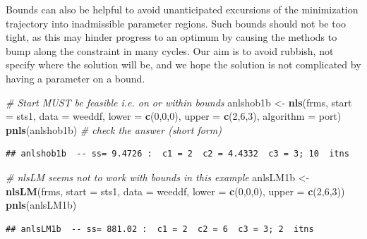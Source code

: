 \documentclass[
]{article}
\newenvironment{Shaded}{\begin{snugshade}}{\end{snugshade}}
\newcommand{\AttributeTok}[1]{\textcolor[rgb]{0.13,0.29,0.53}{#1}}
\newcommand{\CommentTok}[1]{\textcolor[rgb]{0.56,0.35,0.01}{\textit{#1}}}
\newcommand{\DecValTok}[1]{\textcolor[rgb]{0.00,0.00,0.81}{#1}}
\newcommand{\FunctionTok}[1]{\textcolor[rgb]{0.13,0.29,0.53}{\textbf{#1}}}
\newcommand{\NormalTok}[1]{#1}
\newcommand{\OtherTok}[1]{\textcolor[rgb]{0.56,0.35,0.01}{#1}}
\newcommand{\StringTok}[1]{\textcolor[rgb]{0.31,0.60,0.02}{#1}}
\begin{document}
Bounds can also be helpful to avoid unanticipated excursions of the
minimization trajectory into inadmissible parameter regions. Such bounds
should not be too tight, as this may hinder progress to an optimum by
causing the methods to bump along the constraint in many cycles. Our aim
is to avoid rubbish, not specify where the solution will be, and we hope
the solution is not complicated by having a parameter on a bound.

\begin{Shaded}
\begin{Highlighting}[]
\CommentTok{\# Start MUST be feasible i.e. on or within bounds}
\NormalTok{anlshob1b }\OtherTok{\textless{}{-}} \FunctionTok{nls}\NormalTok{(frms, }\AttributeTok{start =}\NormalTok{ sts1, }\AttributeTok{data =}\NormalTok{ weeddf, }\AttributeTok{lower =} \FunctionTok{c}\NormalTok{(}\DecValTok{0}\NormalTok{,}\DecValTok{0}\NormalTok{,}\DecValTok{0}\NormalTok{),}
             \AttributeTok{upper =} \FunctionTok{c}\NormalTok{(}\DecValTok{2}\NormalTok{,}\DecValTok{6}\NormalTok{,}\DecValTok{3}\NormalTok{), }\AttributeTok{algorithm =} \StringTok{\textquotesingle{}port\textquotesingle{}}\NormalTok{)}
\FunctionTok{pnls}\NormalTok{(anlshob1b) }\CommentTok{\#  check the answer (short form)}
\end{Highlighting}
\end{Shaded}

\begin{verbatim}
## anlshob1b  -- ss= 9.4726 :  c1 = 2  c2 = 4.4332  c3 = 3; 10  itns
\end{verbatim}

\begin{Shaded}
\begin{Highlighting}[]
\CommentTok{\# nlsLM seems not to work with bounds in this example}
\NormalTok{anlsLM1b }\OtherTok{\textless{}{-}} \FunctionTok{nlsLM}\NormalTok{(frms, }\AttributeTok{start =}\NormalTok{ sts1, }\AttributeTok{data =}\NormalTok{ weeddf, }\AttributeTok{lower =} \FunctionTok{c}\NormalTok{(}\DecValTok{0}\NormalTok{,}\DecValTok{0}\NormalTok{,}\DecValTok{0}\NormalTok{), }\AttributeTok{upper =} \FunctionTok{c}\NormalTok{(}\DecValTok{2}\NormalTok{,}\DecValTok{6}\NormalTok{,}\DecValTok{3}\NormalTok{))}
\FunctionTok{pnls}\NormalTok{(anlsLM1b)}
\end{Highlighting}
\end{Shaded}

\begin{verbatim}
## anlsLM1b  -- ss= 881.02 :  c1 = 2  c2 = 6  c3 = 3; 2  itns
\end{verbatim}
\end{document}
